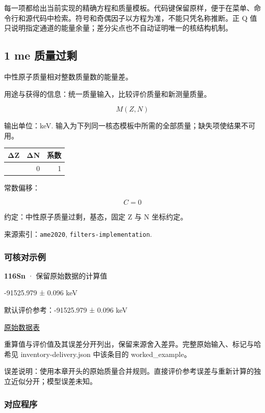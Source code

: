 \documentclass[
  11pt,
  letterpaper,
]{article}
\begin{document}
每一项都给出当前实现的精确方程和质量模板。代码键保留原样，便于在菜单、命令行和源代码中检索。符号和奇偶因子以方程为准，不能只凭名称推断。正
Q 值只说明指定通道的能量余量；差分尖点也不自动证明唯一的核结构机制。

\subsection{1 me 质量过剩}\label{me-ux8d28ux91cfux8fc7ux5269}

中性原子质量相对整数质量数的能量差。

用途与获得的信息：统一质量输入，比较评价质量和新测量质量。

\[
M(Z,N)
\]

输出单位：keV.
输入为下列同一核态模板中所需的全部质量；缺失项使结果不可用。

\begin{longtable}[]{@{}rrr@{}}
\toprule\noalign{}
ΔZ & ΔN & 系数 \\
\midrule\noalign{}
\endhead
\bottomrule\noalign{}
\endlastfoot
0 & 0 & 1 \\
\end{longtable}

常数偏移：

\[
C=0
\]

约定：中性原子质量过剩，基态，固定 Z 与 N 坐标约定。

来源索引：\texttt{ame2020}, \texttt{filters-implementation}.

\subsubsection{可核对示例}\label{ux53efux6838ux5bf9ux793aux4f8b}

\textbf{116Sn} · 保留原始数据的计算值

-91525.979 ± 0.096 keV

默认评价参考：-91525.979 ± 0.096 keV

\href{https://www-nds.iaea.org/amdc/ame2020/mass_1.mas20.txt}{原始数据表}

重算值与评价值及其误差分开列出，保留来源舍入差异。完整原始输入、标记与哈希见
inventory-delivery.json 中该条目的 worked\_example。

误差说明：使用本章开头的原始质量合并规则。直接评价参考误差与重新计算的独立近似分开；模型误差未知。

\subsubsection{对应程序}\label{ux5bf9ux5e94ux7a0bux5e8f}
\end{document}
